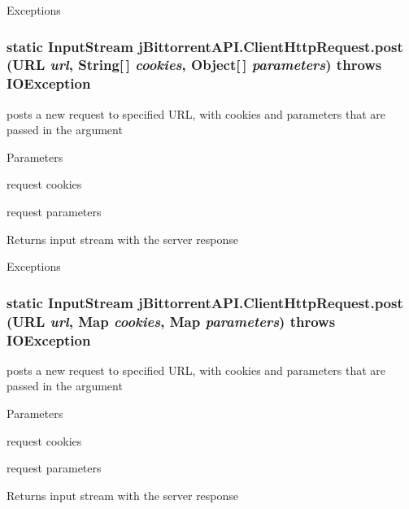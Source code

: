 \begin{DoxyExceptions}{Exceptions}
\item[{\em IOException}]\end{DoxyExceptions}
\hypertarget{classj_bittorrent_a_p_i_1_1_client_http_request_ac123f48f50dfb4b13d3007045943dd7d}{
\subsubsection[{post}]{\setlength{\rightskip}{0pt plus 5cm}static InputStream jBittorrentAPI.ClientHttpRequest.post (URL {\em url}, \/  String\mbox{[}$\,$\mbox{]} {\em cookies}, \/  Object\mbox{[}$\,$\mbox{]} {\em parameters})  throws IOException }}
\label{classj_bittorrent_a_p_i_1_1_client_http_request_ac123f48f50dfb4b13d3007045943dd7d}
posts a new request to specified URL, with cookies and parameters that are passed in the argument 
\begin{DoxyParams}{Parameters}
\item[{\em cookies}]request cookies \item[{\em parameters}]request parameters \end{DoxyParams}
\begin{DoxyReturn}{Returns}
input stream with the server response 
\end{DoxyReturn}

\begin{DoxyExceptions}{Exceptions}
\item[{\em IOException}]\end{DoxyExceptions}
\hypertarget{classj_bittorrent_a_p_i_1_1_client_http_request_acbfe05d2f3688997776974f5684ee61b}{
\subsubsection[{post}]{\setlength{\rightskip}{0pt plus 5cm}static InputStream jBittorrentAPI.ClientHttpRequest.post (URL {\em url}, \/  Map {\em cookies}, \/  Map {\em parameters})  throws IOException }}
\label{classj_bittorrent_a_p_i_1_1_client_http_request_acbfe05d2f3688997776974f5684ee61b}
posts a new request to specified URL, with cookies and parameters that are passed in the argument 
\begin{DoxyParams}{Parameters}
\item[{\em cookies}]request cookies \item[{\em parameters}]request parameters \end{DoxyParams}
\begin{DoxyReturn}{Returns}
input stream with the server response 
\end{DoxyReturn}

